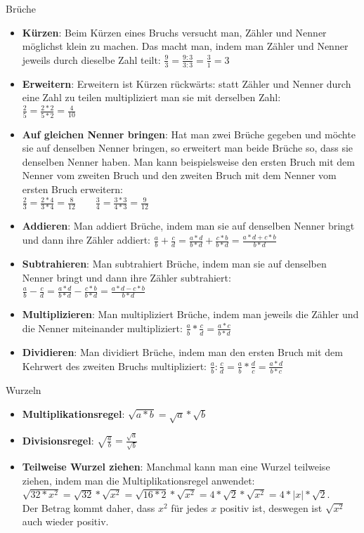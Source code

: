 \begin{bla}{Brüche}
  \begin{itemize}
    \item \textbf{Kürzen}: Beim Kürzen eines Bruchs versucht man, Zähler und Nenner möglichst klein zu machen. Das macht man, indem man Zähler und Nenner jeweils durch dieselbe Zahl teilt: $ \frac{9}{3}=\frac{9:3}{3:3}=\frac{3}{1}=3$
    \item \textbf{Erweitern}: Erweitern ist Kürzen rückwärts: statt Zähler und Nenner durch eine Zahl zu teilen multipliziert man sie mit derselben Zahl: \\$\frac{2}{5}=\frac{2*2}{5*2}=\frac{4}{10}$
    \item \textbf{Auf gleichen Nenner bringen}: Hat man zwei Brüche gegeben und möchte sie auf denselben Nenner bringen, so erweitert man beide Brüche so, dass sie denselben Nenner haben. Man kann beispielsweise den ersten Bruch mit dem Nenner vom zweiten Bruch und den zweiten Bruch mit dem Nenner vom ersten Bruch erweitern: \\ $\frac{2}{3}=\frac{2*4}{3*4}=\frac{8}{12} \qquad \frac{3}{4}=\frac{3*3}{4*3}=\frac{9}{12}$
    \item \textbf{Addieren}: Man addiert Brüche, indem man sie auf denselben Nenner bringt und dann ihre Zähler addiert: $\frac{a}{b}+\frac{c}{d} = \frac{a*d}{b*d}+\frac{c*b}{b*d} = \frac{a*d+c*b}{b*d}$
    \item \textbf{Subtrahieren}: Man subtrahiert Brüche, indem man sie auf denselben Nenner bringt und dann ihre Zähler subtrahiert:
    \\$\frac{a}{b}-\frac{c}{d} = \frac{a*d}{b*d}-\frac{c*b}{b*d} = \frac{a*d-c*b}{b*d}$
    \item \textbf{Multiplizieren}: Man multipliziert Brüche, indem man jeweils die Zähler und die Nenner miteinander multipliziert: $\frac{a}{b}*\frac{c}{d}=\frac{a*c}{b*d}$
    \item \textbf{Dividieren}: Man dividiert Brüche, indem man den ersten Bruch mit dem Kehrwert des zweiten Bruchs multipliziert: $\frac{a}{b}:\frac{c}{d}=\frac{a}{b}*\frac{d}{c}=\frac{a*d}{b*c}$
  \end{itemize}
\end{bla}

\begin{bla}{Wurzeln}
  \begin{itemize}
    \item \textbf{Multiplikationsregel}: $\sqrt{a*b}=\sqrt{a}*\sqrt{b}$
    \item \textbf{Divisionsregel}: $\sqrt{\frac{a}{b}}=\frac{\sqrt{a}}{\sqrt{b}}$
    \item \textbf{Teilweise Wurzel ziehen}: Manchmal kann man eine Wurzel teilweise ziehen, indem man die Multiplikationsregel anwendet: $\sqrt{32*x^2}=\sqrt{32}*\sqrt{x^2}=\sqrt{16*2}*\sqrt{x^2}=4*\sqrt{2}*\sqrt{x^2}=4*|x|*\sqrt{2}$.
    \\Der Betrag kommt daher, dass $x^2$ für jedes $x$ positiv ist, deswegen ist $\sqrt{x^2}$ auch wieder positiv.
  \end{itemize}
\end{bla}

